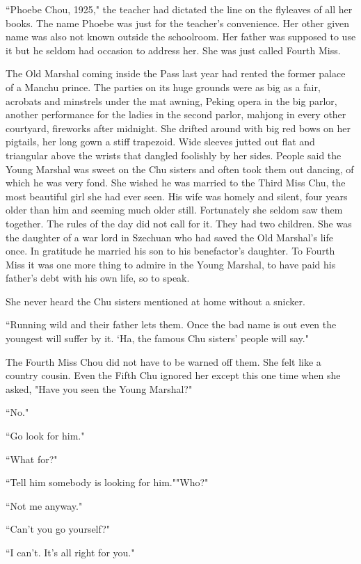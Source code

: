 \par ``Phoebe Chou, 1925," the teacher had dictated the line on the flyleaves of all her books. The name Phoebe was just for the teacher's convenience. Her other given name was also not known outside the schoolroom. Her father was supposed to use it but he seldom had occasion to address her. She was just called Fourth Miss.
\par The Old Marshal coming inside the Pass last year had rented the former palace of a Manchu prince. The parties on its huge grounds were as big as a fair, acrobats and minstrels under the mat awning, Peking opera in the big parlor, another performance for the ladies in the second parlor, mahjong in every other courtyard, fireworks after midnight. She drifted around with big red bows on her pigtails, her long gown a stiff trapezoid. Wide sleeves jutted out flat and triangular above the wrists that dangled foolishly by her sides. People said the Young Marshal was sweet on the Chu sisters and often took them out dancing, of which he was very fond. She wished he was married to the Third Miss Chu, the most beautiful girl she had ever seen. His wife was homely and silent, four years older than him and seeming much older still. Fortunately she seldom saw them together. The rules of the day did not call for it. They had two children. She was the daughter of a war lord in Szechuan who had saved the Old Marshal's life once. In gratitude he married his son to his benefactor's daughter. To Fourth Miss it was one more thing to admire in the Young Marshal, to have paid his father's debt with his own life, so to speak.
\par She never heard the Chu sisters mentioned at home without a snicker.
\par ``Running wild and their father lets them. Once the bad name is out even the youngest will suffer by it. ‘Ha, the famous Chu sisters' people will say."
\par The Fourth Miss Chou did not have to be warned off them. She felt like a country cousin. Even the Fifth Chu ignored her except this one time when she asked, "Have you seen the Young Marshal?"
\par ``No."
\par ``Go look for him."
\par ``What for?"
\par ``Tell him somebody is looking for him.""Who?"
\par ``Not me anyway."
\par ``Can't you go yourself?"
\par ``I can't. It's all right for you."
